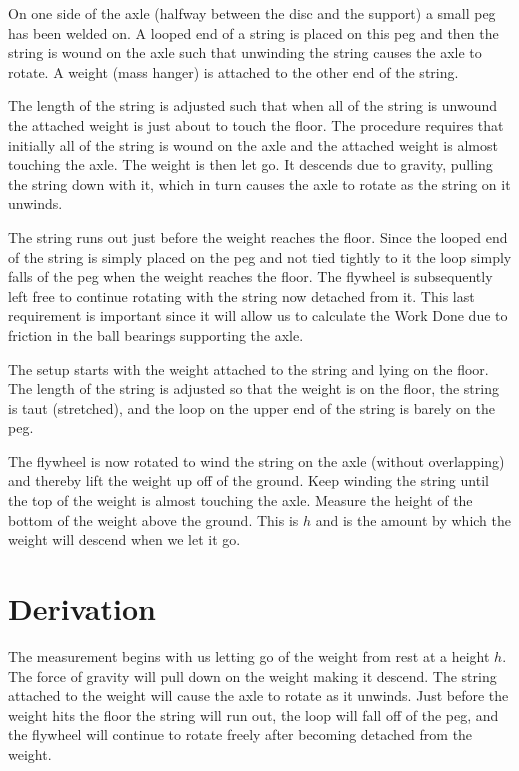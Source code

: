     On one side of the axle (halfway between the disc and the support) a small peg has been welded on. A looped end of a string is placed on this peg and then the string is wound on the axle such that unwinding the string causes the axle to rotate. A weight (mass hanger) is attached to the other end of the string.

    The length of the string is adjusted such that when all of the string is unwound the attached weight is just about to touch the floor. The procedure requires that initially all of the string is wound on the axle and the attached weight is almost touching the axle. The weight is then let go. It descends due to gravity, pulling the string down with it, which in turn causes the axle to rotate as the string on it unwinds.

    The string runs out just before the weight reaches the floor. Since the looped end of the string is simply placed on the peg and not tied tightly to it the loop simply falls of the peg when the weight reaches the floor. The flywheel is subsequently left free to continue rotating with the string now detached from it. This last requirement is important since it will allow us to calculate the Work Done due to friction in the ball bearings supporting the axle.

    The setup starts with the weight attached to the string and lying on the floor. The length of the string is adjusted so that the weight is on the floor, the string is taut (stretched), and the loop on the upper end of the string is barely on the peg.

    The flywheel is now rotated to wind the string on the axle (without overlapping) and thereby lift the weight up off of the ground. Keep winding the string until the top of the weight is almost touching the axle. Measure the height of the bottom of the weight above the ground. This is $h$ and is the amount by which the weight will descend when we let it go.

\section{Derivation}

    The measurement begins with us letting go of the weight from rest at a height $h$. The force of gravity will pull down on the weight making it descend. The string attached to the weight will cause the axle to rotate as it unwinds. Just before the weight hits the floor the string will run out, the loop will fall off of the peg, and the flywheel will continue to rotate freely after becoming detached from the weight.


